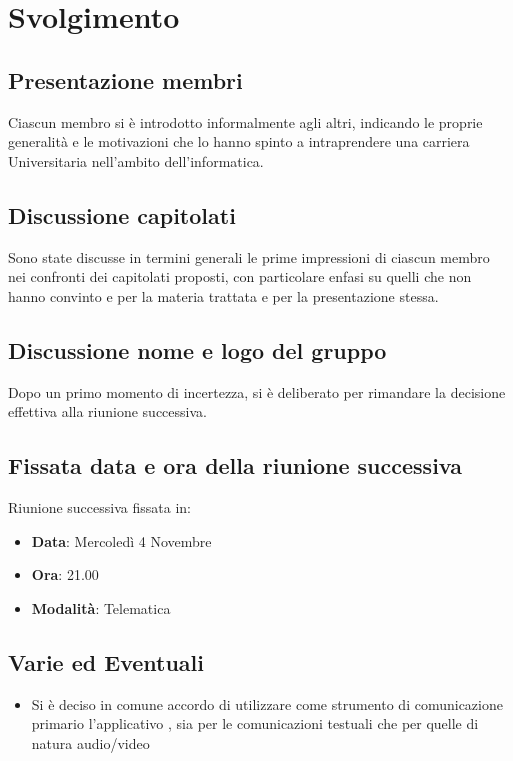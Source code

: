 \documentclass[]{article}
\begin{document}
	\newpage

	\section{Svolgimento}
	\subsection{Presentazione membri}
	Ciascun membro si è introdotto informalmente agli altri, indicando le proprie generalità e le motivazioni che lo hanno spinto a intraprendere una carriera Universitaria nell'ambito dell'informatica.\\

	\subsection{Discussione capitolati}
	Sono state discusse in termini generali le prime impressioni di ciascun membro nei confronti dei capitolati proposti, con particolare enfasi su quelli che non hanno convinto e per la materia trattata e per la presentazione stessa. \\

	\subsection{Discussione nome e logo del gruppo}
	Dopo un primo momento di incertezza, si è deliberato per rimandare la decisione effettiva alla riunione successiva.

	\subsection{Fissata data e ora della riunione successiva}
	Riunione successiva fissata in:
	\begin{itemize}
		\item \textbf{Data}: Mercoledì 4 Novembre
		\item \textbf{Ora}: 21.00
		\item \textbf{Modalità}: Telematica
	\end{itemize}

	\subsection{Varie ed Eventuali}
	\begin{itemize}
		\item Si è deciso in comune accordo di utilizzare come strumento di comunicazione primario l'applicativo , sia per le comunicazioni testuali che per quelle di natura audio/video
	\end{itemize}
\end{document}
